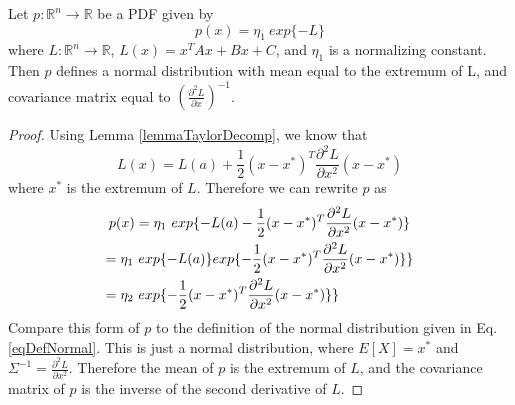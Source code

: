 \begin{lemma} 
	\label{lemmaHessianInverse}
	Let \(p: \mathbb{R}^n \to \mathbb{R}\) be a PDF given by \[
	p(x) = \eta_1\ exp\{ - L \}
	\]
	where \(L: \mathbb{R}^n \to \mathbb{R}\), \(L(x) = x^T Ax + Bx + C\), and \(\eta_1\) is a normalizing constant. Then \(p\) defines a normal distribution with mean equal to the extremum of L, and covariance matrix equal to \((\frac{\partial^2 L}{\partial x})^{-1}\).
\end{lemma}
\begin{proof}
	Using Lemma \ref{lemmaTaylorDecomp}, we know that \[
	L(x) = L(a) + \frac{1}{2} (x-x^*)^T \frac{\partial^2 L}{\partial x^2} (x-x^*)
	\] where \(x^*\) is the extremum of \(L\).
	Therefore we can rewrite \(p\) as
	\begin{multline*}
	p(x) = \eta_1\ exp\{ -L(a) - \frac{1}{2} (x-x^*)^T \frac{\partial^2 L}{\partial x^2} (x-x^*)\} \\
	= \eta_1\ exp \{ -L(a) \} exp \{ - \frac{1}{2} (x-x^*)^T \frac{\partial^2 L}{\partial x^2} (x-x^*)\} \} \\
	= \eta_2\ exp \{ - \frac{1}{2} (x-x^*)^T \frac{\partial^2 L}{\partial x^2} (x-x^*)\} \} \hfill
	\end{multline*}
	Compare this form of \(p\) to the definition of the normal distribution given in Eq. \ref{eqDefNormal}. This is just a normal distribution, where \(E[X] = x^*\) and \(\Sigma^{-1} = \frac{\partial^2 L}{\partial x^2}\). Therefore the mean of \(p\) is the extremum of \(L\), and the covariance matrix of \(p\) is the inverse of the second derivative of \(L\). 
\end{proof}


